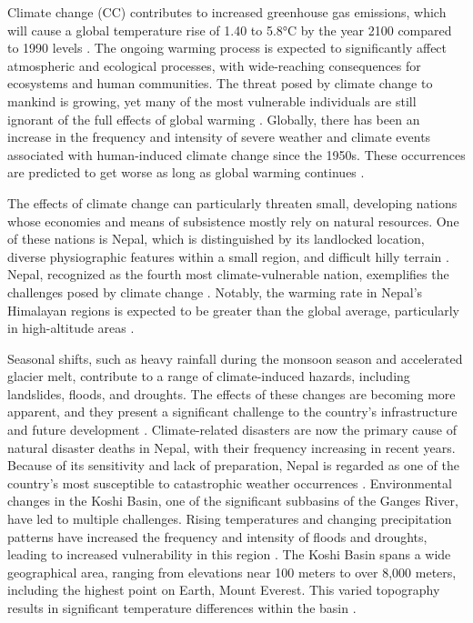 Climate change (CC) contributes to increased greenhouse gas emissions, which will cause a global temperature rise of 1.40 to 5.8°C by the year 2100 compared to 1990 levels \parencite{mccarthy_climate_2001}. The ongoing warming process is expected to significantly affect atmospheric and ecological processes, with wide-reaching consequences for ecosystems and human communities. The threat posed by climate change to mankind is growing, yet many of the most vulnerable individuals are still ignorant of the full effects of global warming \parencite{maharjan_tharu_nodate}. Globally, there has been an increase in the frequency and intensity of severe weather and climate events associated with human-induced climate change since the 1950s. These occurrences are predicted to get worse as long as global warming continues \parencite{intergovernmental_panel_on_climate_change_ipcc_climate_2023}.

The effects of climate change can particularly threaten small, developing nations whose economies and means of subsistence mostly rely on natural resources. One of these nations is Nepal, which is distinguished by its landlocked location, diverse physiographic features within a small region, and difficult hilly terrain \parencite{shrestha_climate_2011}. Nepal, recognized as the fourth most climate-vulnerable nation, exemplifies the challenges posed by climate change \parencite{manandhar_adapting_2011,reilly_climate_in_usa}. Notably, the warming rate in Nepal's Himalayan regions is expected to be greater than the global average, particularly in high-altitude areas \parencite{casestudy_bhattarai,yao_recent_2019,shrestha_maximum_1999}.


Seasonal shifts, such as heavy rainfall during the monsoon season and accelerated glacier melt, contribute to a range of climate-induced hazards, including landslides, floods, and droughts. The effects of these changes are becoming more apparent, and they present a significant challenge to the country’s infrastructure and future development \parencite{pokhrel_climate_2013}. Climate-related disasters are now the primary cause of natural disaster deaths in Nepal, with their frequency increasing in recent years. Because of its sensitivity and lack of preparation, Nepal is regarded as one of the country’s most susceptible to catastrophic weather occurrences \parencite{aksha_spatial_2018}. Environmental changes in the Koshi Basin, one of the significant subbasins of the Ganges River, have led to multiple challenges. Rising temperatures and changing precipitation patterns have increased the frequency and intensity of floods and droughts, leading to increased vulnerability in this region \parencite{bastakoti_agriculture_2017}. The Koshi Basin spans a wide geographical area, ranging from elevations near 100 meters to over 8,000 meters, including the highest point on Earth, Mount Everest. This varied topography results in significant temperature differences within the basin \parencite{bhatt_climate_2014}.

